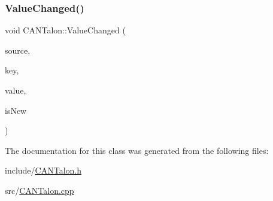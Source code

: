 \mbox{\label{class_c_a_n_talon_a818d5dc06bb866af9f52ccbed9d040ae}} 
\subsubsection{\texorpdfstring{Value\+Changed()}{ValueChanged()}}
{\footnotesize\ttfamily void C\+A\+N\+Talon\+::\+Value\+Changed (\begin{DoxyParamCaption}\item[{I\+Table $\ast$}]{source,  }\item[{llvm\+::\+String\+Ref}]{key,  }\item[{std\+::shared\+\_\+ptr$<$ nt\+::\+Value $>$}]{value,  }\item[{bool}]{is\+New }\end{DoxyParamCaption})\hspace{0.3cm}{\ttfamily [override]}}



The documentation for this class was generated from the following files\+:\begin{DoxyCompactItemize}
\item 
include/\hyperlink{_c_a_n_talon_8h}{C\+A\+N\+Talon.\+h}\item 
src/\hyperlink{_c_a_n_talon_8cpp}{C\+A\+N\+Talon.\+cpp}\end{DoxyCompactItemize}
